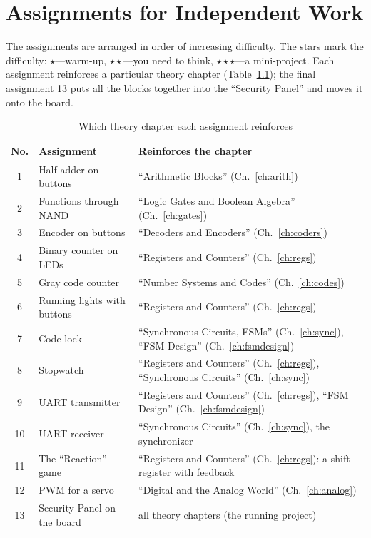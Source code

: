 \chapter{Assignments for Independent Work}
\label{ch:tasks}

The assignments are arranged in order of increasing difficulty. The stars mark
the difficulty: \textcolor{FpgaOrange}{$\star$}---warm-up,
\textcolor{FpgaOrange}{$\star\star$}---you need to think,
\textcolor{FpgaOrange}{$\star\star\star$}---a mini-project. Each assignment
reinforces a particular theory chapter (Table~\ref{tab:task-map}); the
final assignment 13 puts all the blocks together into the ``Security Panel''
and moves it onto the board.

\begin{table}[H]
\centering
\caption{Which theory chapter each assignment reinforces}
\label{tab:task-map}
\small
\begin{tabularx}{\textwidth}{c X X}
\toprule
\textbf{No.} & \textbf{Assignment} & \textbf{Reinforces the chapter} \\
\midrule
1  & Half adder on buttons & ``Arithmetic Blocks'' (Ch.~\ref{ch:arith}) \\
2  & Functions through NAND & ``Logic Gates and Boolean Algebra'' (Ch.~\ref{ch:gates}) \\
3  & Encoder on buttons & ``Decoders and Encoders'' (Ch.~\ref{ch:coders}) \\
4  & Binary counter on LEDs & ``Registers and Counters'' (Ch.~\ref{ch:regs}) \\
5  & Gray code counter & ``Number Systems and Codes'' (Ch.~\ref{ch:codes}) \\
6  & Running lights with buttons & ``Registers and Counters'' (Ch.~\ref{ch:regs}) \\
7  & Code lock & ``Synchronous Circuits, FSMs'' (Ch.~\ref{ch:sync}), ``FSM Design'' (Ch.~\ref{ch:fsmdesign}) \\
8  & Stopwatch & ``Registers and Counters'' (Ch.~\ref{ch:regs}), ``Synchronous Circuits'' (Ch.~\ref{ch:sync}) \\
9  & UART transmitter & ``Registers and Counters'' (Ch.~\ref{ch:regs}), ``FSM Design'' (Ch.~\ref{ch:fsmdesign}) \\
10 & UART receiver & ``Synchronous Circuits'' (Ch.~\ref{ch:sync}), the synchronizer \\
11 & The ``Reaction'' game & ``Registers and Counters'' (Ch.~\ref{ch:regs}): a shift register with feedback \\
12 & PWM for a servo & ``Digital and the Analog World'' (Ch.~\ref{ch:analog}) \\
13 & Security Panel on the board & all theory chapters (the running project) \\
\bottomrule
\end{tabularx}
\end{table}

